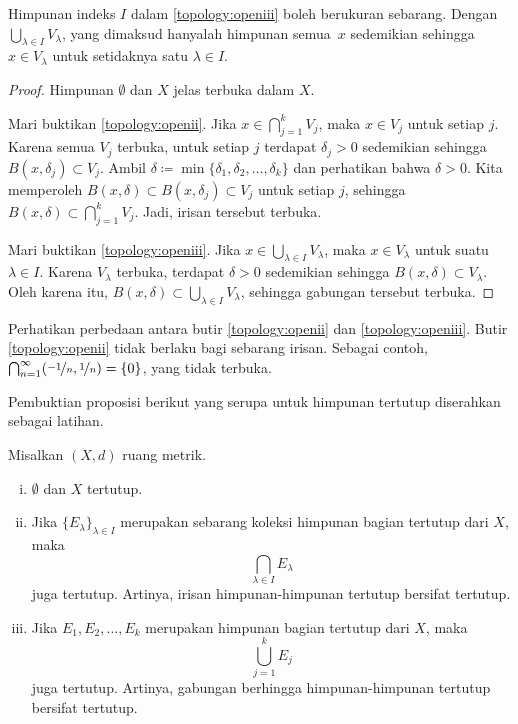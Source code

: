Himpunan indeks $I$ dalam \ref{topology:openiii} boleh berukuran sebarang.
Dengan $\bigcup_{\lambda \in I} V_\lambda$, yang dimaksud hanyalah himpunan
semua~$x$ sedemikian sehingga $x \in V_\lambda$ untuk setidaknya satu $\lambda \in I$.

\begin{proof}
Himpunan $\emptyset$ dan $X$ jelas terbuka dalam $X$.

Mari buktikan \ref{topology:openii}.
Jika $x \in \bigcap_{j=1}^k V_j$, maka $x \in V_j$ untuk setiap $j$.
Karena semua $V_j$ terbuka, untuk setiap $j$ terdapat $\delta_j > 0$
sedemikian sehingga $B(x,\delta_j) \subset V_j$.  Ambil $\delta \coloneqq \min \{
\delta_1,\delta_2,\ldots,\delta_k \}$ dan perhatikan bahwa $\delta > 0$.  Kita memperoleh
$B(x,\delta) \subset B(x,\delta_j) \subset V_j$ untuk setiap $j$, sehingga
$B(x,\delta) \subset \bigcap_{j=1}^k V_j$.  Jadi, irisan tersebut terbuka.

Mari buktikan \ref{topology:openiii}.
Jika $x \in \bigcup_{\lambda \in I} V_\lambda$, maka $x \in V_\lambda$ untuk suatu
$\lambda \in I$.
Karena $V_\lambda$ terbuka, terdapat $\delta > 0$
sedemikian sehingga $B(x,\delta) \subset V_\lambda$.  Oleh karena itu,
$B(x,\delta) \subset \bigcup_{\lambda \in I} V_\lambda$,
sehingga gabungan tersebut terbuka.
\end{proof}

\begin{example}
Perhatikan perbedaan antara
butir
\ref{topology:openii} dan \ref{topology:openiii}.
Butir \ref{topology:openii} tidak berlaku bagi sebarang irisan.
Sebagai contoh,
$\bigcap_{n=1}^\infty (\nicefrac{-1}{n},\nicefrac{1}{n}) = \{ 0 \}$,
yang tidak terbuka.
\end{example}


Pembuktian proposisi berikut yang serupa untuk himpunan tertutup
diserahkan sebagai latihan.

\begin{prop} \label{prop:topology:closed}
\pagebreak[2]
Misalkan $(X,d)$ ruang metrik.
\begin{enumerate}[(i)]
\item \label{topology:closedi} $\emptyset$ dan $X$ tertutup.
\item \label{topology:closedii} Jika $\{ E_\lambda \}_{\lambda \in I}$ merupakan
sebarang koleksi himpunan bagian tertutup dari $X$, maka
\begin{equation*}
\bigcap_{\lambda \in I} E_\lambda
\end{equation*}
juga tertutup.  Artinya, irisan himpunan-himpunan tertutup bersifat tertutup.
\item \label{topology:closediii} Jika $E_1, E_2, \ldots, E_k$ merupakan himpunan bagian
tertutup dari $X$, maka
\begin{equation*}
\bigcup_{j=1}^k E_j
\end{equation*}
juga tertutup.  Artinya, gabungan berhingga himpunan-himpunan tertutup bersifat tertutup.
\end{enumerate}
\end{prop}

